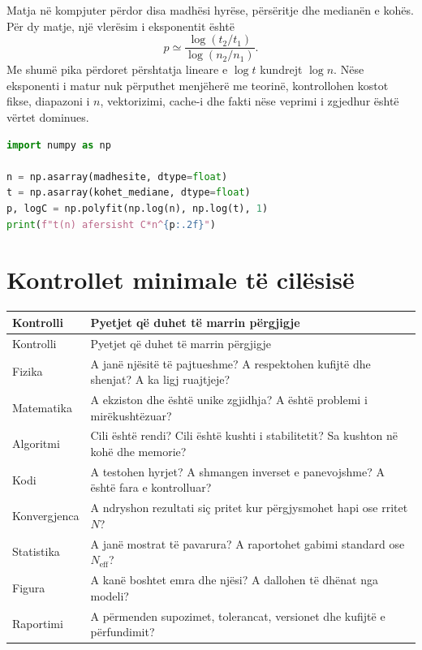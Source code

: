 \documentclass[11pt,oneside,openany]{book}
\begin{document}
Matja në kompjuter përdor disa madhësi hyrëse, përsëritje dhe medianën e
kohës. Për dy matje, një vlerësim i eksponentit është
\begin{equation}
 p\simeq\frac{\log(t_2/t_1)}{\log(n_2/n_1)}.
\end{equation}
Me shumë pika përdoret përshtatja lineare e $\log t$ kundrejt $\log n$.
Nëse eksponenti i matur nuk përputhet menjëherë me teorinë, kontrollohen
kostot fikse, diapazoni i $n$, vektorizimi, cache-i dhe fakti nëse veprimi i
zgjedhur është vërtet dominues.

\begin{lstlisting}[language=Python,caption={Vlerësimi i pjerrësisë log--log.}]
import numpy as np

n = np.asarray(madhesite, dtype=float)
t = np.asarray(kohet_mediane, dtype=float)
p, logC = np.polyfit(np.log(n), np.log(t), 1)
print(f"t(n) afersisht C*n^{p:.2f}")
\end{lstlisting}

\section{Kontrollet minimale të cilësisë}
\begin{longtable}{p{}p{}}
\toprule
Kontrolli & Pyetjet që duhet të marrin përgjigje\\ \midrule
\endfirsthead
\toprule Kontrolli & Pyetjet që duhet të marrin përgjigje\\ \midrule\endhead
Fizika & A janë njësitë të pajtueshme? A respektohen kufijtë dhe shenjat? A ka ligj ruajtjeje?\\
Matematika & A ekziston dhe është unike zgjidhja? A është problemi i mirëkushtëzuar?\\
Algoritmi & Cili është rendi? Cili është kushti i stabilitetit? Sa kushton në kohë dhe memorie?\\
Kodi & A testohen hyrjet? A shmangen inverset e panevojshme? A është fara e kontrolluar?\\
Konvergjenca & A ndryshon rezultati siç pritet kur përgjysmohet hapi ose rritet $N$?\\
Statistika & A janë mostrat të pavarura? A raportohet gabimi standard ose $N_{\mathrm{eff}}$?\\
Figura & A kanë boshtet emra dhe njësi? A dallohen të dhënat nga modeli?\\
Raportimi & A përmenden supozimet, tolerancat, versionet dhe kufijtë e përfundimit?\\
\bottomrule
\end{longtable}
\end{document}
